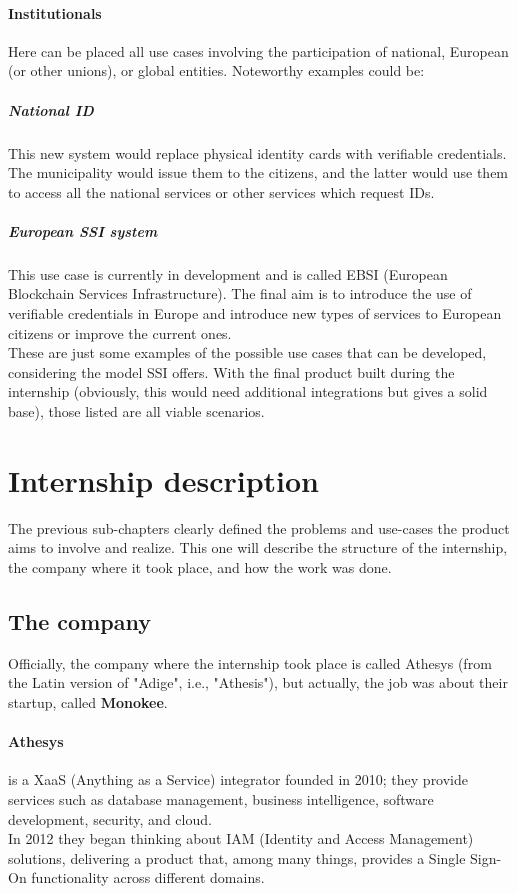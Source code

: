 \paragraph{Institutionals}
Here can be placed all use cases involving the participation of national, 
European (or other unions), or global entities.
Noteworthy examples could be:
    \subparagraph{National ID} This new system would replace physical identity 
    cards with verifiable credentials. The municipality would issue them to the 
    citizens, and the latter would use them to access all the national services 
    or other services which request IDs.
    \subparagraph{European SSI system} This use case is currently in development 
    and is called EBSI (European Blockchain Services Infrastructure). The final 
    aim is to introduce the use of verifiable credentials in Europe and introduce 
    new types of services to European citizens or improve the current ones.
\vspace*{0.3cm}\\
These are just some examples of the possible use cases that can be developed, 
considering the model SSI offers.
With the final product built during the internship (obviously, this would need 
additional integrations but gives a solid base), those listed are all viable 
scenarios.
\section{Internship description}
The previous sub-chapters clearly defined the problems and use-cases the product 
aims to involve and realize. This one will describe the structure of the internship, 
the company where it took place, and how the work was done.
\subsection{The company}
Officially, the company where the internship took place is 
called Athesys (from the Latin version of "Adige", i.e., "Athesis"), but actually, 
the job was about their startup, called \textbf{Monokee}.
    \paragraph{Athesys} is a XaaS (Anything as a Service) integrator founded 
    in 2010; they provide     services such as database management, business 
    intelligence, software development, security, and cloud.\\
    In 2012 they began thinking about IAM (Identity and Access Management) solutions, 
    delivering a product that, among many things, provides a Single Sign-On 
    functionality across different domains.
